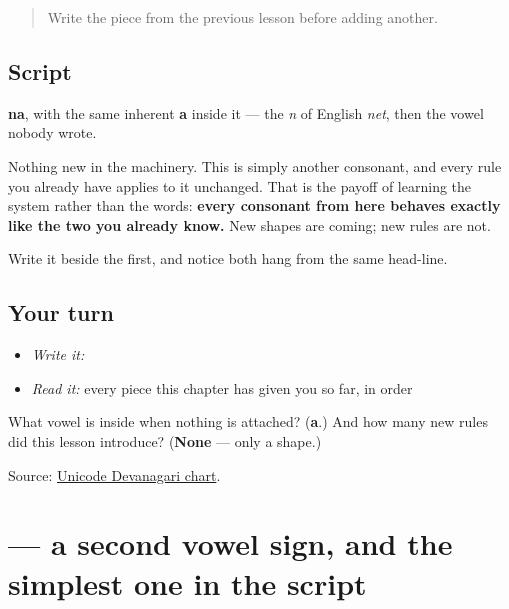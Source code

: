 \label{lesson:MR-W01-na}



\begin{quote}
Write the piece from the previous lesson before adding another.
\end{quote}

\subsection*{Script}
\begin{quote}
\end{quote}

\textbf{na}, with the same inherent \textbf{a} inside it — the \emph{n} of English \emph{net}, then the vowel nobody wrote.

Nothing new in the machinery. This is simply another consonant, and every rule you already have applies to it unchanged. That is the payoff of learning the system rather than the words: \textbf{every consonant from here behaves exactly like the two you already know.} New shapes are coming; new rules are not.

Write it beside the first, and notice both hang from the same head-line.

\subsection*{Your turn}
\begin{itemize}
\raggedright
  \item \emph{Write it:} 
  \item \emph{Read it:} every piece this chapter has given you so far, in order
\end{itemize}

\begin{tcolorbox}[breakable,colback=teal!4,colframe=teal!35!black,title={Before you move on}]
What vowel is inside \textbf{} when nothing is attached? (\textbf{a}.) And how many new rules did this lesson introduce? (\textbf{None} — only a shape.)

Source: \href{https://www.unicode.org/charts/PDF/U0900.pdf}{Unicode Devanagari chart}.
\end{tcolorbox}
\section[-ā]{ — a second vowel sign, and the simplest one in the script}

\label{lesson:MR-W01-aa-matra}




